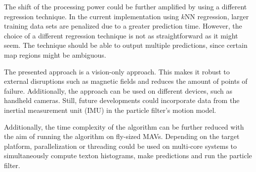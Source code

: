 The shift of the processing power could be further amplified by using
a different regression technique. In the current implementation using
$k$NN regression, larger training data sets are penalized due to a
greater prediction time. However, the choice of a different regression
technique is not as straightforward as it might seem. The technique
should be able to output multiple predictions, since certain map
regions might be ambiguous.

The presented approach is a vision-only approach. This makes it robust to external disruptions such as magnetic fields and reduces the amount of points of failure. Additionally, the approach can be used on different devices, such as handheld cameras. Still, future developments could incorporate data from the inertial measurement unit (IMU) in the
particle filter’s motion model.

Additionally, the time complexity of the algorithm can be further reduced with the aim of running the algorithm on
fly-sized MAVs. Depending on the target platform, parallelization or threading could be used on multi-core systems to simultaneously compute texton histograms, make predictions and run the particle filter.     


